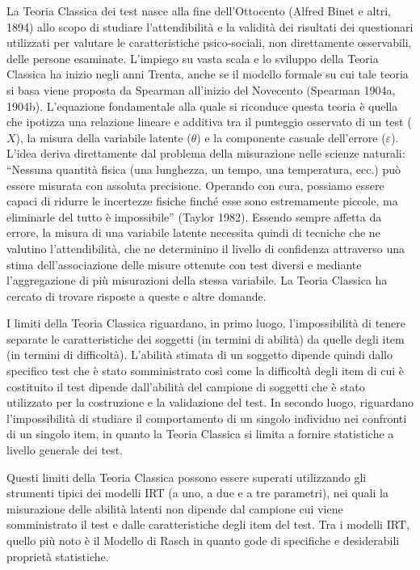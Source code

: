 La Teoria Classica dei test nasce alla fine dell'Ottocento (Alfred Binet e altri, 1894) allo scopo di studiare l'attendibilità e la validità dei risultati dei questionari utilizzati per valutare le caratteristiche psico-sociali, non direttamente osservabili, delle persone esaminate. L'impiego su vasta scala e lo sviluppo della Teoria Classica ha inizio negli anni Trenta, anche se il modello formale su cui tale teoria si basa viene proposta da Spearman all'inizio del Novecento (Spearman 1904a, 1904b). L'equazione fondamentale alla quale si riconduce questa teoria è quella che ipotizza una relazione lineare e additiva tra il punteggio osservato di un test ($X$), la misura della variabile latente ($\theta$) e la componente casuale dell'errore ($\varepsilon$). L'idea deriva direttamente dal problema della misurazione nelle scienze naturali: ``Nessuna quantità fisica (una lunghezza, un tempo, una temperatura, ecc.) può essere misurata con assoluta precisione. Operando con cura, possiamo essere capaci di ridurre le incertezze fisiche finché esse sono estremamente piccole, ma eliminarle del tutto è impossibile'' (Taylor 1982). 
Essendo sempre affetta da errore, la misura di una variabile latente necessita quindi di tecniche che ne valutino l'attendibilità, che ne determinino il livello di confidenza attraverso una stima dell'associazione delle misure ottenute con test diversi e mediante l'aggregazione di più misurazioni della stessa variabile. 
La Teoria Classica ha cercato di trovare risposte a queste e altre domande.

I limiti della Teoria Classica riguardano, in primo luogo, l'impossibilità di tenere separate le caratteristiche dei soggetti (in termini di abilità) da quelle degli item (in termini di difficoltà). L'abilità stimata di un soggetto dipende quindi dallo specifico test che è stato somministrato così come la difficoltà degli item di cui è costituito il test dipende dall'abilità del campione di soggetti che è stato utilizzato per la costruzione e la validazione del test. In secondo luogo, riguardano l'impossibilità di studiare il comportamento di un singolo individuo nei confronti di un singolo item, in quanto la Teoria Classica si limita a fornire statistiche a livello generale dei test. 

Questi  limiti  della  Teoria  Classica possono essere superati utilizzando gli strumenti tipici  dei modelli IRT (a uno, a due e a tre parametri), nei quali la  misurazione  delle  abilità  latenti non  dipende  dal campione cui viene somministrato il test e dalle caratteristiche degli item del test. Tra i modelli IRT, quello più noto è il Modello di Rasch in quanto gode di specifiche e desiderabili proprietà statistiche.
